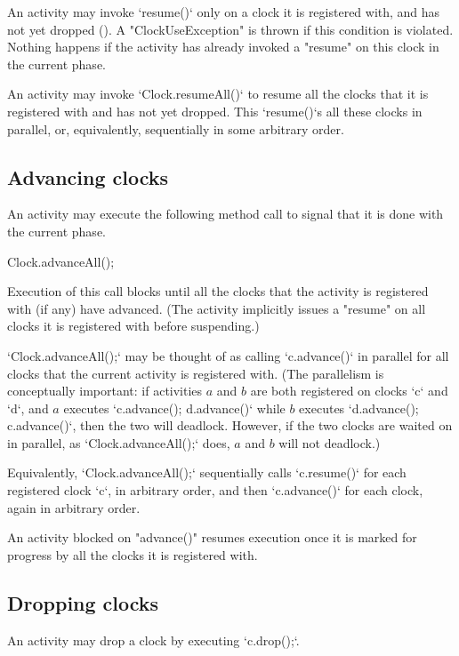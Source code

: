 An activity may invoke \xcd`resume()` only on a clock it is registered with,
and has not yet dropped (). A
\xcd"ClockUseException" is thrown if this
condition is violated. Nothing happens if the activity has already invoked a
\xcd"resume" on this clock in the current phase.

An activity may invoke \xcd`Clock.resumeAll()` to resume all the clocks that
it is registered with and has not yet dropped.  This \xcd`resume()`s all
these clocks in parallel, or, equivalently, sequentially in some arbitrary
order.  

\subsection{Advancing clocks}\label{sec:clock:next}
An activity may execute the following method call to signal that it is done
with the current phase.
\begin{xten}
Clock.advanceAll();
\end{xten}

\noindent 
Execution of this call blocks until all the clocks that the
activity is registered with (if any) have advanced. (The activity
implicitly issues a \xcd"resume" on all clocks it is registered
with before suspending.)

\xcd`Clock.advanceAll();` may be thought of as calling \xcd`c.advance()` in parallel for all
clocks that the current activity is registered with.  (The parallelism is
conceptually important: if activities {$a$} and {$b$} are both
registered on clocks \xcd`c` and \xcd`d`, and {$a$} executes
\xcd`c.advance(); d.advance()` while {$b$} executes \xcd`d.advance(); c.advance()`,
then the two will deadlock.  However, if the two clocks are waited on in
parallel, as \xcd`Clock.advanceAll();` does, {$a$} and {$b$} will not deadlock.)

Equivalently, \xcd`Clock.advanceAll();` sequentially calls \xcd`c.resume()` for each
registered clock \xcd`c`, in arbitrary order, and then \xcd`c.advance()` for each
clock, again in arbitrary order.  



An activity blocked on \xcd"advance()" resumes execution once
it is marked for progress by all the clocks it is registered with.

\subsection{Dropping clocks}\label{sec:clock:drop}
An activity may drop a clock by executing \xcd`c.drop();`.



